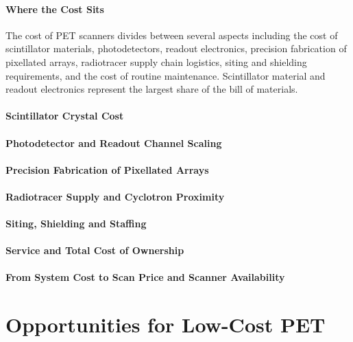 \paragraph{Where the Cost Sits}
The cost of PET scanners divides between several aspects including the cost of scintillator materials, photodetectors, readout electronics, precision fabrication of pixellated arrays, radiotracer supply chain logistics, siting and shielding requirements, and the cost of routine maintenance.
Scintillator material and readout electronics represent the largest share of the bill of materials.

\paragraph{Scintillator Crystal Cost}

\paragraph{Photodetector and Readout Channel Scaling}

\paragraph{Precision Fabrication of Pixellated Arrays}

\paragraph{Radiotracer Supply and Cyclotron Proximity}

\paragraph{Siting, Shielding and Staffing}

\paragraph{Service and Total Cost of Ownership}

\paragraph{From System Cost to Scan Price and Scanner Availability}

\section{Opportunities for Low-Cost PET}

